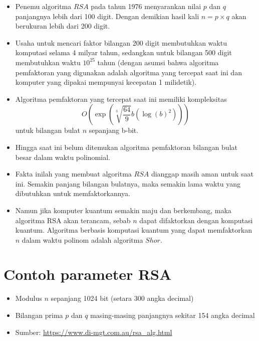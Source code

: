 \documentclass{article}
\begin{document}
\newpage


\begin{itemize}
    \item Penemu algoritma $RSA$ pada tahun 1976 menyarankan nilai $p$ dan $q$ panjangnya lebih dari 100 digit. Dengan demikian hasil kali $n = p \times q$ akan berukuran lebih dari 200 digit.
    \item Usaha untuk mencari faktor bilangan 200 digit membutuhkan waktu komputasi selama 4 milyar tahun, sedangkan untuk bilangan 500 digit membutuhkan waktu $10^{25}$ tahun (dengan asumsi bahwa algoritma pemfaktoran yang digunakan adalah algoritma yang tercepat saat ini dan komputer yang dipakai mempunyai kecepatan 1 milidetik).
    \item Algoritma pemfaktoran yang tercepat saat ini memiliki kompleksitas
    \[ O(\exp(\sqrt[3]{\frac{64}{9}}b(\log(b)^2))) \]
    untuk bilangan bulat $n$ sepanjang b-bit.
\end{itemize}

\newpage


\begin{itemize}
  \item Hingga saat ini belum ditemukan algoritma pemfaktoran bilangan bulat besar dalam waktu polinomial.
  \item Fakta inilah yang membuat algoritma $RSA$ dianggap masih aman untuk saat ini. Semakin panjang bilangan bulatnya, maka semakin lama waktu yang dibutuhkan untuk memfaktorkannya.
  \item Namun jika komputer kuantum semakin maju dan berkembang, maka algoritma RSA akan terancam, sebab $n$ dapat difaktorkan dengan komputasi kuantum. Algoritma berbasis komputasi kuantum yang dapat memfaktorkan $n$ dalam waktu polinom adalah algoritma $Shor$.
\end{itemize}

\newpage


\section*{Contoh parameter RSA}

\begin{itemize}
    \item Modulus $n$ sepanjang 1024 bit (setara 300 angka decimal)
    \item Bilangan prima $p$ dan $q$ masing-masing panjangnya sekitar 154 angka decimal
    \item Sumber: \url{https://www.di-mgt.com.au/rsa_alg.html}
\end{itemize}
\end{document}
